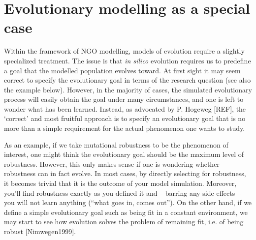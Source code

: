 \section{Evolutionary modelling as a special case}

Within the framework of NGO modelling, models of evolution require a slightly specialized treatment. The issue is that \emph{in silico} evolution requires us to predefine a goal that the modelled population evolves toward. At first sight it may seem correct to specify the evolutionary goal in terms of the research question (see also the example below). However, in the majority of cases, the simulated evolutionary process will easily obtain the goal under many circumstances, and one is left to wonder what has been learned. Instead, as advocated by P. Hogeweg [REF], the `correct' and most fruitful approach is to specify an evolutionary goal that is no more than a simple requirement for the actual phenomenon one wants to study. 

As an example, if we take mutational robustness to be the phenomenon of interest, one might think the evolutionary goal should be the maximum level of robustness. However, this only makes sense if one is wondering whether robustness can in fact evolve. In most cases, by directly selecting for robustness, it becomes trivial that it is the outcome of your model simulation. Moreover, you’ll find robustness exactly as you defined it and -- barring any side-effects -- you will not learn anything (``what goes in, comes out''). On the other hand, if we define a simple evolutionary goal such as being fit in a constant environment, we may start to see how evolution solves the problem of remaining fit, i.e. of being robust [Nimwegen1999].
